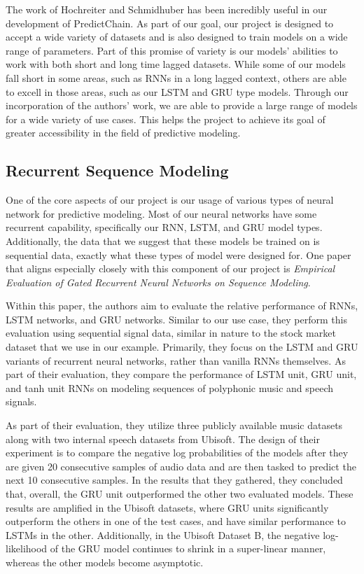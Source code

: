 \documentclass{article}
\begin{document}
    The work of Hochreiter and Schmidhuber has been incredibly useful in our development of PredictChain.  As part of
    our goal, our project is designed to accept a wide variety of datasets and is also designed to train models on
    a wide range of parameters.  Part of this promise of variety is our models' abilities to work with both short
    and long time lagged datasets.  While some of our models fall short in some areas, such as RNNs in a long lagged
    context, others are able to excell in those areas, such as our LSTM and GRU type models.  Through our incorporation
    of the authors' work, we are able to provide a large range of models for a wide variety of use cases.  This helps
    the project to achieve its goal of greater accessibility in the field of predictive modeling.


    \subsection{Recurrent Sequence Modeling}

    One of the core aspects of our project is our usage of various types of neural network for predictive modeling.
    Most of our neural networks have some recurrent capability, specifically our RNN, LSTM, and GRU model types.
    Additionally, the data that we suggest that these models be trained on is sequential data, exactly what these
    types of model were designed for.  One paper that aligns especially closely with this component of our project
    is \textit{Empirical Evaluation of Gated Recurrent Neural Networks on Sequence Modeling}\cite{recurrentModeling}.

    Within this paper, the authors aim to evaluate the relative performance of RNNs, LSTM networks, and GRU networks.
    Similar to our use case, they perform this evaluation using sequential signal data, similar in nature to the
    stock market dataset that we use in our example.  Primarily, they focus on the LSTM and GRU variants of
    recurrent neural networks, rather than vanilla RNNs themselves.  As part of their evaluation, they compare
    the performance of LSTM unit, GRU unit, and tanh unit RNNs on modeling sequences of polyphonic music and
    speech signals.

    As part of their evaluation, they utilize three publicly available music datasets along with two internal speech
    datasets from Ubisoft.  The design of their experiment is to compare the negative log probabilities of the models
    after they are given 20 consecutive samples of audio data and are then tasked to predict the next 10 consecutive
    samples.  In the results that they gathered, they concluded that, overall, the GRU unit outperformed the other
    two evaluated models.  These results are amplified in the Ubisoft datasets, where GRU units significantly
    outperform the others in one of the test cases, and have similar performance to LSTMs in the other.  Additionally,
    in the Ubisoft Dataset B, the negative log-likelihood of the GRU model continues to shrink in a super-linear manner,
    whereas the other models become asymptotic.
\end{document}
